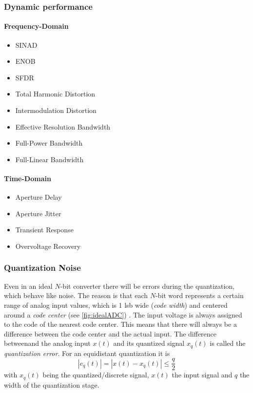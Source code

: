 \subsubsection{Dynamic performance}
\paragraph{Frequency-Domain}
\begin{itemize}
	\item SINAD
	\item ENOB
	\item SFDR
	\item Total Harmonic Distortion
	\item Intermodulation Distortion
	\item Effective Resolution Bandwidth
	\item Full-Power Bandwidth
	\item Full-Linear Bandwidth
\end{itemize}
\paragraph{Time-Domain}
\begin{itemize}
	\item Aperture Delay
	\item Aperture Jitter
	\item Transient Response
	\item Overvoltage Recovery
\end{itemize}

\subsubsection{Quantization Noise}
Even in an ideal $N$-bit converter there will be errors during the quantization, which behave like noise.
The reason is that each $N$-bit word represents a certain range of analog input values, which is 1 \gls{lsb} wide (\textit{code width}) and centered around a \textit{code center} (see \autoref{fig:idealADC}) \cite{Lundberg}.
The input voltage is always assigned to the code of the nearest code center. 
This means that there will always be a difference between the code center and the actual input.
The difference betweenand the analog input $x(t)$ and its quantized signal $x_q(t)$ is called the \textit{quantization error}.
For an equidistant quantization it is
\begin{equation}
\left| e_q(t) \right| = \left| x(t) - x_q(t) \right| \leq \frac{q}{2}
\end{equation}
with $x_q(t)$ being the quantized/discrete signal, $x(t)$ the input signal and $q$ the width of the quantization stage. \cite{puente2015}

